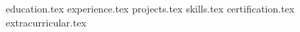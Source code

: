 \documentclass[12pt, a4paper]{awesome-cv}
\newcommand*{\sectiondir}{resume/}
\begin{document}
\makecvheader

{education.tex}
\vspace*{-4.0ex}
{experience.tex}
\vspace*{-5ex}
{projects.tex}
\vspace*{-4ex}
{skills.tex}
{certification.tex}
{extracurricular.tex}
\end{document}
